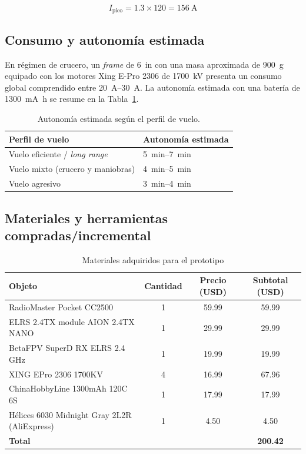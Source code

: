 \documentclass[12pt, letterpaper]{report}
\begin{document}
\begin{equation}
I_{\text{pico}} = 1.3 \times 120 = \SI{156}{\ampere}
\end{equation}

\subsection{Consumo y autonomía estimada}

En régimen de crucero, un \textit{frame} de \SI{6}{in} con una masa aproximada 
de \SI{900}{\gram} equipado con los motores Xing E-Pro 2306 de 
\SI{1700}{\kilo\volt} presenta un consumo global comprendido entre 
\SIrange{20}{30}{\ampere}. La autonomía estimada con una batería de 
\SI{1300}{\milli\ampere\hour} se resume en la Tabla~\ref{tab:autonomia}.

\begin{table}[htbp]
\centering
\caption{Autonomía estimada según el perfil de vuelo.}
\label{tab:autonomia}
\begin{tabular}{@{}ll@{}}
\toprule
\textbf{Perfil de vuelo} & \textbf{Autonomía estimada} \\
\midrule
Vuelo eficiente / \textit{long range} & \SIrange{5}{7}{\minute} \\
Vuelo mixto (crucero y maniobras)     & \SIrange{4}{5}{\minute} \\
Vuelo agresivo                        & \SIrange{3}{4}{\minute} \\
\bottomrule
\end{tabular}
\end{table}
\pagebreak

\subsection{Materiales y herramientas compradas/incremental}

\begin{table}[htbp]
\centering
\caption{Materiales adquiridos para el prototipo}
\label{tab:materiales_comprados}
\renewcommand{\arraystretch}{1.3}
\setlength{\tabcolsep}{8pt}
\begin{tabularx}{\textwidth}{@{}Xccc@{}}
\toprule
\rowcolor{gray!20}
\textbf{Objeto} & \textbf{Cantidad} & \textbf{Precio (USD)} & \textbf{Subtotal (USD)} \\
\midrule
RadioMaster Pocket CC2500 & 1 & 59.99 & 59.99 \\
ELRS 2.4TX module AION 2.4TX NANO & 1 & 29.99 & 29.99 \\
BetaFPV SuperD RX ELRS 2.4\,GHz & 1 & 19.99 & 19.99 \\
XING EPro 2306 1700KV & 4 & 16.99 & 67.96 \\
ChinaHobbyLine 1300mAh 120C 6S & 1 & 17.99 & 17.99 \\
Hélices 6030 Midnight Gray 2L2R (AliExpress) & 1 & 4.50 & 4.50 \\
\midrule
\textbf{Total} & & & \textbf{200.42} \\
\bottomrule
\end{tabularx}
\end{table}
\end{document}
